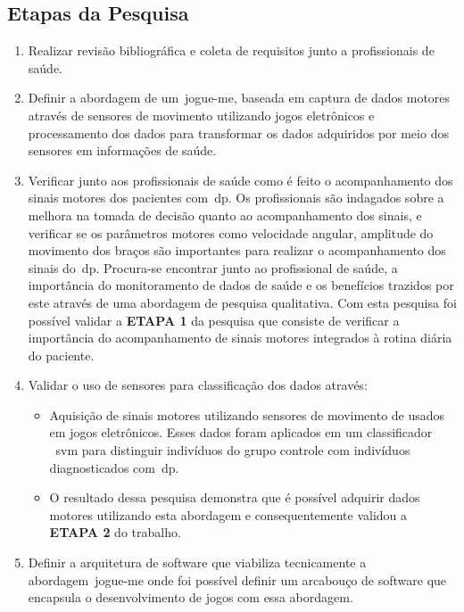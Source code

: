 \subsection{Etapas da Pesquisa}
\begin{enumerate}

\item{Realizar revisão bibliográfica e coleta de requisitos junto a profissionais de saúde.}

\item{Definir a abordagem de um~\ac{jogue-me}, baseada em captura de dados motores através de sensores de movimento utilizando jogos eletrônicos e processamento dos dados para transformar os dados adquiridos por meio dos sensores em informações de saúde.}

\item{Verificar junto aos profissionais de saúde como é feito o acompanhamento dos sinais motores dos pacientes com~\ac{dp}. Os profissionais são indagados sobre a melhora na tomada de decisão quanto ao acompanhamento dos sinais, e verificar se os parâmetros motores como velocidade angular, amplitude do movimento dos braços são importantes para realizar o acompanhamento dos sinais do~\ac{dp}. Procura-se encontrar junto ao profissional de saúde, a importância do monitoramento de dados de saúde e os benefícios trazidos por este através de uma abordagem de pesquisa qualitativa. Com esta pesquisa foi possível validar a \textbf{ETAPA 1} da pesquisa que consiste de verificar a importância do acompanhamento de sinais motores integrados à rotina diária do paciente.}

\item{Validar o uso de sensores para classificação dos dados através:} 
	\begin{itemize}
		\item Aquisição de sinais motores utilizando sensores de movimento de usados em jogos eletrônicos. Esses dados foram aplicados em um classificador ~\ac{svm} para distinguir indivíduos do grupo controle com indivíduos diagnosticados com~\ac{dp}. 
		\item O resultado dessa pesquisa demonstra que é possível adquirir dados motores utilizando esta abordagem e consequentemente validou a \textbf{ETAPA 2} do trabalho.
	\end{itemize}
\item{Definir a arquitetura de software que viabiliza tecnicamente a abordagem~\ac{jogue-me} onde foi possível definir um arcabouço de software que encapsula o desenvolvimento de jogos com essa abordagem.}


\end{enumerate}
